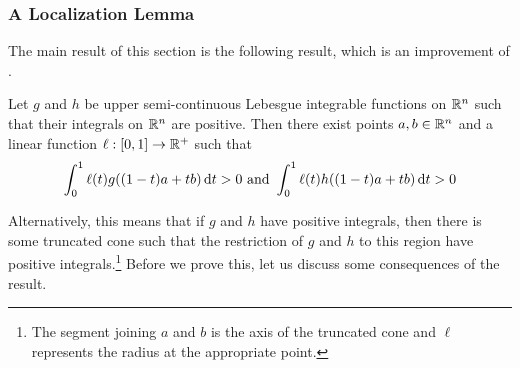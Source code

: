 \subsubsection{A Localization Lemma}

The main result of this section is the following result, which is an improvement of .

\begin{ftheo}
Let $g$ and $h$ be upper semi-continuous Lebesgue integrable functions on $\mathbb{R}^n$ such that their integrals on $\mathbb{R}^n$ are positive. Then there exist points $a,b\in\mathbb{R}^n$ and a linear function $\ell:[0,1]\to\mathbb{R}^+$ such that
\[ \int_0^1 \ell(t)g((1-t)a+tb)\operatorname{d}\!{t} > 0 \text{ and } \int_0^1 \ell(t)h((1-t)a+tb)\operatorname{d}\!{t} > 0 \]
\end{ftheo}

Alternatively, this means that if $g$ and $h$ have positive integrals, then there is some truncated cone such that the restriction of $g$ and $h$ to this region have positive integrals.\footnote{The segment joining $a$ and $b$ is the axis of the truncated cone and $\ell$ represents the radius at the appropriate point.} Before we prove this, let us discuss some consequences of the result.

